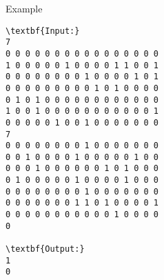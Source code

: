 Example
\begin{verbatim}
\textbf{Input:}
7
0 0 0 0 0 0 0 0 0 0 0 0 0 0 0 0
1 0 0 0 0 0 1 0 0 0 0 1 1 0 0 1
0 0 0 0 0 0 0 0 1 0 0 0 0 1 0 1
0 0 0 0 0 0 0 0 0 1 0 1 0 0 0 0
0 1 0 1 0 0 0 0 0 0 0 0 0 0 0 0
1 0 0 1 0 0 0 0 0 0 0 0 0 0 0 1
0 0 0 0 0 1 0 0 1 0 0 0 0 0 0 0
7
0 0 0 0 0 0 0 0 1 0 0 0 0 0 0 0
0 0 1 0 0 0 0 1 0 0 0 0 0 1 0 0
0 0 0 1 0 0 0 0 0 0 1 0 1 0 0 0
0 1 0 0 0 0 0 1 0 0 0 0 1 0 0 0
0 0 0 0 0 0 0 0 1 0 0 0 0 0 0 0
0 0 0 0 0 0 0 1 1 0 1 0 0 0 0 1
0 0 0 0 0 0 0 0 0 0 0 1 0 0 0 0
0

\textbf{Output:}
1
0\end{verbatim}